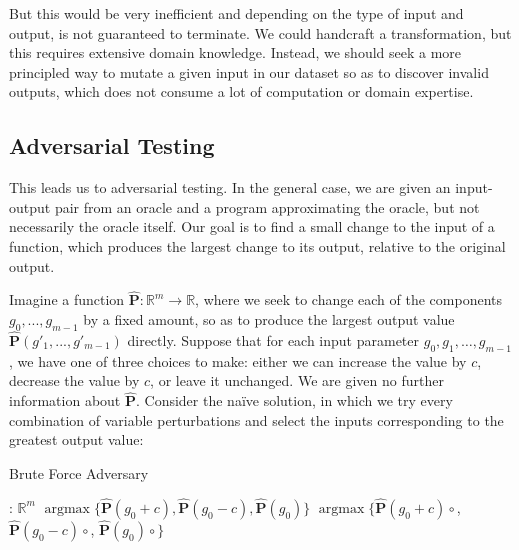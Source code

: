 \documentclass[12pt,initial,twoside,maitrise]{dms}
\numberwithin{equation}{section}
\numberwithin{table}{chapter}
\numberwithin{figure}{chapter}
\begin{document}
But this would be very inefficient and depending on the type of input and output, is not guaranteed to terminate. We could handcraft a transformation, but this requires extensive domain knowledge. Instead, we should seek a more principled way to mutate a given input in our dataset so as to discover invalid outputs, which does not consume a lot of computation or domain expertise.

\subsection{Adversarial Testing}

This leads us to adversarial testing. In the general case, we are given an input-output pair from an oracle and a program approximating the oracle, but not necessarily the oracle itself. Our goal is to find a small change to the input of a function, which produces the largest change to its output, relative to the original output.

Imagine a function $\mathbf{\hat P}: \mathbb R^m \rightarrow \mathbb R$, where we seek to change each of the components $g_0, ..., g_{m-1}$ by a fixed amount, so as to produce the largest output value $\mathbf{\hat P}(g'_1, ..., g'_{m-1})$ directly. Suppose that for each input parameter $g_0, g_1, \ldots, g_{m-1}$, we have one of three choices to make: either we can increase the value by $c$, decrease the value by $c$, or leave it unchanged. We are given no further information about $\mathbf{\hat P}$. Consider the na\"ive solution, in which we try every combination of variable perturbations and select the inputs corresponding to the greatest output value:

\begin{algorithm}[H]
\caption{Brute Force Adversary}
\label{alg:bf_adversary}
\begin{algorithmic}[1]
: $\mathbb{R}^m$
 
\State \Return $\operatorname{argmax}\{\mathbf{\hat P}(g_0 + c), \mathbf{\hat P}(g_0 - c), \mathbf{\hat P}(g_0)\}$
\Else {}
\State \Return $\operatorname{argmax}\{\mathbf{\hat P}(g_0 + c) \circ$,\newline
\hspace*{10em} $\mathbf{\hat P}(g_0 - c)\circ$,\newline
\hspace*{10em} $\mathbf{\hat P}(g_0)\circ$$\}$
\EndIf
\EndProcedure
\end{algorithmic}
\end{algorithm}
\end{document}
